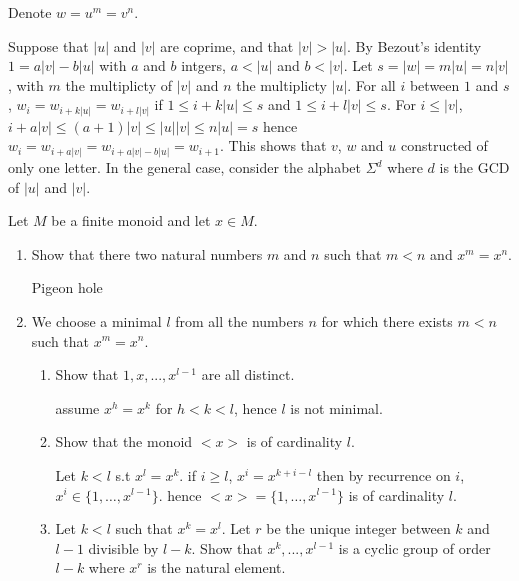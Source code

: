 \documentclass[a4paper,11pt]{exam}
\begin{document}
\begin{questions}
\begin{solution}
	Denote $w=u^m=v^n$.
	
	Suppose that $|u|$ and $|v|$ are coprime,
	and that $|v|>|u|$.
	By Bezout's identity $1=a|v|-b|u|$ with $a$ and $b$ intgers, $a<|u|$ and $b<|v|$.
	Let $s=|w|=m|u|=n|v|$, with $m$ the multiplicty of $|v|$ and $n$ the multiplicty $|u|$.
	For all $i$ between $1$ and $s$, $w_i=w_{i+k|u|}=w_{i+l|v|}$ if $1 \leq i+k|u| \leq s$ and $1 \leq i+l|v| \leq s$.
	For $i \leq |v|$, $i+a|v| \leq (a+1)|v| \leq |u||v| \leq n|u| = s$ hence
	$w_i = w_{i+a|v|} = w_{i+a|v|-b|u|}=w_{i+1}$.
	This shows that $v$, $w$ and $u$ constructed of only one letter.
	In the general case, consider the alphabet $\Sigma^d$ where $d$ is
	the GCD of $|u|$ and $|v|$.
\end{solution}

  \question
  Let $M$ be a finite monoid and let $x \in M$.
  \begin{enumerate}
    \item Show that there two natural numbers $m$ and $n$ such that $m<n$ and
      $x^m = x^n$.

      \begin{solution}
        Pigeon hole
      \end{solution}

    \item We choose a minimal $l$ from all the numbers $n$ for which there exists
      $m<n$ such that $x^m = x^n$.
      \begin{enumerate}
        \item Show that $1,x,...,x^{l-1}$ are all distinct.

          \begin{solution}
            assume $x^h=x^k$ for $h<k<l$, hence $l$ is not minimal. 
          \end{solution}

        \item Show that the monoid $<x>$ is of cardinality $l$.

          \begin{solution}
            Let $k<l$ s.t $x^l=x^k$.
            if $i \geq l$, $x^i=x^{k+i-l}$ then by recurrence on $i$,
            $x^i \in \{1, \dots, x^{l-1} \}$.
            hence $<x>=\{1, \dots, x^{l-1} \}$ is of cardinality $l$.
          \end{solution}

        \item Let $k<l$ such that $x^k = x^l$. Let $r$ be the unique integer between $k$ and $l-1$ divisible by $l-k$.
        Show that $x^k,...,x^{l-1}$ is a cyclic group of order $l-k$ where $x^r$ is the natural element.


\end{enumerate}
\end{enumerate}
\end{questions}
\end{document}
